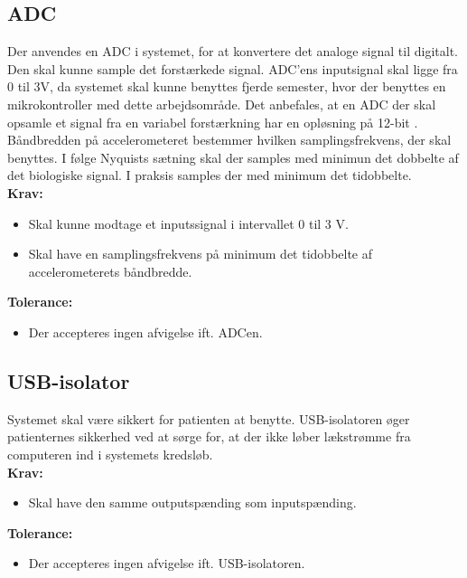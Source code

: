 \subsection{ADC}
Der anvendes en ADC i systemet, for at konvertere det analoge signal til digitalt. Den skal kunne sample det forstærkede signal. ADC'ens inputsignal skal ligge fra 0 til 3V, da systemet skal kunne benyttes fjerde semester, hvor der benyttes en mikrokontroller med dette arbejdsområde. Det anbefales, at en ADC der skal opsamle et signal fra en variabel forstærkning har en opløsning på 12-bit \cite{Zouridakis2003}. Båndbredden på accelerometeret bestemmer hvilken samplingsfrekvens, der skal benyttes. I følge Nyquists sætning skal der samples med minimun det dobbelte af det biologiske signal. I praksis samples der med minimum det tidobbelte. \\
\textbf{Krav:}
\begin{itemize}
\item Skal kunne modtage et inputssignal i intervallet 0 til 3 V.
\item Skal have en samplingsfrekvens på minimum det tidobbelte af accelerometerets båndbredde.
\end{itemize}
\textbf{Tolerance:}
\begin{itemize}
\item Der accepteres ingen afvigelse ift. ADCen.
\end{itemize}
\subsection{USB-isolator}
Systemet skal være sikkert for patienten at benytte. USB-isolatoren øger patienternes sikkerhed ved at sørge for, at der ikke løber lækstrømme fra computeren ind i systemets kredsløb.\\
\textbf{Krav:}
\begin{itemize}
\item Skal have den samme outputspænding som inputspænding. 
\end{itemize}
\textbf{Tolerance:}
\begin{itemize}
\item Der accepteres ingen afvigelse ift. USB-isolatoren. 
\end{itemize}
